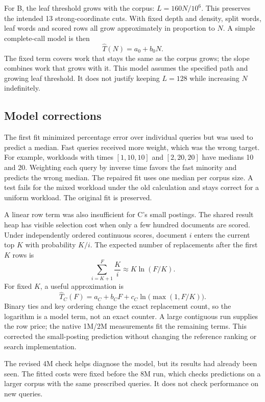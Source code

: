 For B, the leaf threshold grows with the corpus: $L=160N/10^6$. This preserves the intended
13 strong-coordinate cuts. With fixed depth and density, split words, leaf words and scored
rows all grow approximately in proportion to $N$. A simple complete-call model is then
\[
\widehat T(N)=a_0+b_0N.
\]
The fixed term covers work that stays the same as the corpus grows; the slope combines
work that grows with it. This model assumes the specified path and growing leaf threshold.
It does not justify keeping $L=128$ while increasing $N$ indefinitely.

\subsection{Model corrections}
The first fit minimized percentage error over individual queries but was used to predict a
median. Fast queries received more weight, which was the wrong target. For example, workloads
with times $[1,10,10]$ and $[2,20,20]$ have medians 10 and 20. Weighting each query by inverse
time favors the fast minority and predicts the wrong median. The repaired fit uses one median
per corpus size. A test fails for the mixed workload under the old calculation and stays correct
for a uniform workload. The original fit is preserved.

A linear row term was also insufficient for C's small postings. The shared result heap has
visible selection cost when only a few hundred documents are scored. Under independently
ordered continuous scores, document $i$ enters the current top $K$ with probability $K/i$.
The expected number of replacements after the first $K$ rows is
\[
\sum_{i=K+1}^{F}\frac{K}{i}\approx K\ln(F/K).
\]
For fixed $K$, a useful approximation is
\begin{equation}
\widehat T_C(F)=a_C+b_CF+c_C\ln\!\bigl(\max(1,F/K)\bigr).
\label{eq:small-posting-time}
\end{equation}
Binary ties and key ordering change the exact replacement count, so the logarithm is a model
term, not an exact counter. A large contiguous run supplies the row price; the native 1M/2M
measurements fit the remaining terms. This corrected the small-posting prediction without
changing the reference ranking or search implementation.

The revised 4M check helps diagnose the model, but its results had already been seen.
The fitted costs were fixed before the 8M run, which checks predictions on a larger corpus
with the same prescribed queries. It does not check performance on new queries.

